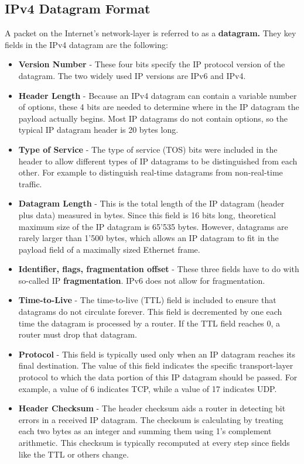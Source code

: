 \subsection{IPv4 Datagram Format}
A packet on the Internet's network-layer is referred to as a \textbf{datagram.} They key fields in the IPv4 datagram are the following:
\begin{itemize}
\item \textbf{Version Number} - These four bits specify the IP protocol version of the datagram. The two widely used IP versions are IPv6 and IPv4.
\item \textbf{Header Length} - Because an IPv4 datagram can contain a variable number of options, these 4 bits are needed to determine where in the IP datagram the payload actually begins. Most IP datagrams do not contain options, so the typical IP datagram header is 20 bytes long.
\item \textbf{Type of Service} - The type of service (TOS) bits were included in the header to allow different types of IP datagrams to be distinguished from each other. For example to distinguish real-time datagrams from non-real-time traffic. 
\item \textbf{Datagram Length} - This is the total length of the IP datagram (header plus data) measured in bytes. Since this field is 16 bits long, theoretical maximum size of the IP datagram is 65'535 bytes. However, datagrams are rarely larger than 1'500 bytes, which allows an IP datagram to fit in the payload field of a maximally sized Ethernet frame.
\item \textbf{Identifier, flags, fragmentation offset} - These three fields have to do with so-called IP \textbf{fragmentation}. IPv6 does not allow for fragmentation.
\item \textbf{Time-to-Live} - The time-to-live (TTL) field is included to ensure that datagrams do not circulate forever. This field is decremented by one each time the datagram is processed by a router. If the TTL field reaches 0, a router must drop that datagram.
\item \textbf{Protocol} - This field is typically used only when an IP datagram reaches its final destination. The value of this field indicates the specific transport-layer protocol to which the data portion of this IP datagram should be passed. For example, a value of 6 indicates TCP, while a value of 17 indicates UDP. 
\item \textbf{Header Checksum} - The header checksum aids a router in detecting bit errors in a received IP datagram. The checksum is calculating by treating each two bytes as an integer and summing them using 1's complement arithmetic. This checksum is typically recomputed at every step since fields like the TTL or others change.

\end{itemize}
